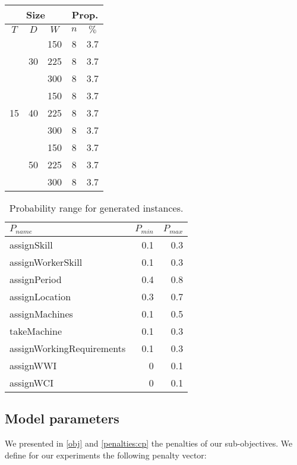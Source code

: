 \documentclass[../../thesis.tex]{subfiles}
\begin{document}
\begin{table}[H]
\begin{tabular}[t]{|c|c|c |c|c|}
    \hline
    \multicolumn{3}{|c|}{Size} & \multicolumn{2}{|c|}{Prop.} \\
    \hline 
    $T$ & $D$ & $W$ & $n$ & $\%$ \\
    \hline 
    \multirow{9}{*}{15} & \multirow{3}{*}{30} & 150 & 8 & 3.7 \\ 
    \cline{3-5}
     &  & 225 & 8 & 3.7 \\ 
     \cline{3-5}
     &  & 300 & 8 & 3.7 \\ 
     \cline{2-5}
     & \multirow{3}{*}{40} & 150 & 8 & 3.7 \\ 
     \cline{3-5}
     &  & 225 & 8 & 3.7 \\ 
     \cline{3-5}
     &  & 300 & 8 & 3.7 \\ 
     \cline{2-5}
     & \multirow{3}{*}{50} & 150 & 8 & 3.7 \\ 
     \cline{3-5}
     &  & 225 & 8 & 3.7 \\ 
     \cline{3-5}
     &  & 300 & 8 & 3.7 \\ 
    \hline
  \end{tabular}
\end{table}


\begin{table}[H]
  \caption{Probability range for generated instances.}
  \label{instances:probabilities}
  \centering
  \begin{tabular}[t]{|l r r|}
    \hline 
    $P_{name}$ & $P_{min}$ & $P_{max}$ \\
    \hline
    assignSkill & 0.1 & 0.3 \\
    assignWorkerSkill & 0.1 & 0.3 \\
    assignPeriod & 0.4 & 0.8 \\
    assignLocation & 0.3 & 0.7 \\
    assignMachines & 0.1 & 0.5 \\
    takeMachine & 0.1 & 0.3 \\
    assignWorkingRequirements & 0.1 & 0.3 \\
    assignWWI & 0 & 0.1 \\
    assignWCI & 0 & 0.1 \\
    \hline
  \end{tabular}
\end{table}

\subsection{Model parameters}

We presented in \autoref{obj} and \autoref{penalties:cp} the penalties of our sub-objectives.
We define for our experiments the following penalty vector:
\end{document}
